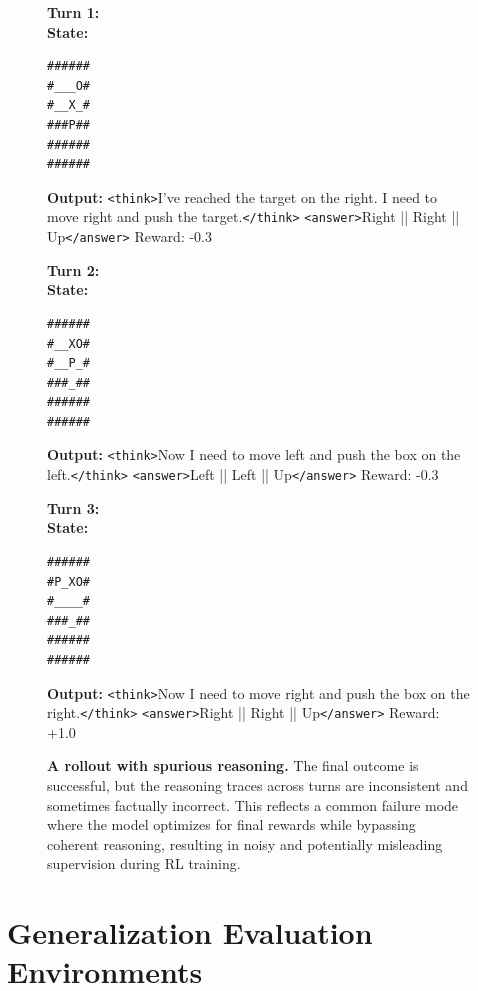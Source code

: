 
\begin{figure}[t]
\centering
\small
\begin{tcolorbox}[colback=gray!2, colframe=black, boxrule=0.5pt, arc=2pt, width=0.95\linewidth, title=Sokoban – Spurious Reasoning Case (3 Turns)]
\textbf{Turn 1:} \\
\textbf{State:}
\begin{verbatim}
######
#___O#
#__X_#
###P##
######
######
\end{verbatim}
\textbf{Output:}  
\texttt{<think>}I've reached the target on the right. I need to move right and push the target.\texttt{</think>}  
\texttt{<answer>}Right || Right || Up\texttt{</answer>}  
Reward: -0.3

\vspace{4pt}
\textbf{Turn 2:} \\
\textbf{State:}
\begin{verbatim}
######
#__XO#
#__P_#
###_##  
######  
######  
\end{verbatim}
\textbf{Output:}  
\texttt{<think>}Now I need to move left and push the box on the left.\texttt{</think>}  
\texttt{<answer>}Left || Left || Up\texttt{</answer>}  
Reward: -0.3

\vspace{4pt}
\textbf{Turn 3:} \\
\textbf{State:}
\begin{verbatim}
######
#P_XO#
#____#
###_##  
######  
######  
\end{verbatim}
\textbf{Output:}  
\texttt{<think>}Now I need to move right and push the box on the right.\texttt{</think>}  
\texttt{<answer>}Right || Right || Up\texttt{</answer>}  
Reward: +1.0
\end{tcolorbox}

\vspace{4pt}
\caption{\textbf{A rollout with spurious reasoning.} The final outcome is successful, but the reasoning traces across turns are inconsistent and sometimes factually incorrect. This reflects a common failure mode where the model optimizes for final rewards while bypassing coherent reasoning, resulting in noisy and potentially misleading supervision during RL training.}
\label{fig:sokoban-spurious}
\vspace{-10pt}
\end{figure}


\section{Generalization Evaluation Environments}
\label{app:generalization-task}

